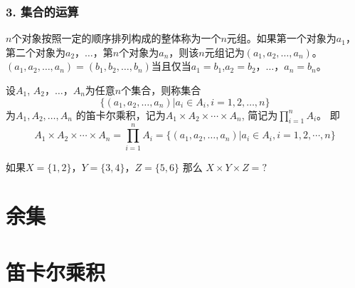 \documentclass{beamer}
\begin{document}
\begin{CJK*}{UTF8}{gbsn}
\begin{frame}
  \frametitle{3. 集合的运算}
  \begin{Def}
    $n$个对象按照一定的顺序排列构成的整体称为一个\alert{$n$元组}。如果第一个对象为$a_1$，第二个对象为$a_2$，$\ldots$，第$n$个对象为$a_n$，则该$n$元组记为$(a_1,a_2, \ldots, a_n)$。
$(a_1,a_2, \ldots, a_n)=(b_1,b_2, \ldots, b_n)$当且仅当$a_1=b_1$,$a_2=b_2$，$\ldots$，$a_n=b_n$。
  \end{Def}\pause
  \begin{Def}
    设$A_1$, $A_2$，$\ldots$，$A_n$为任意$n$个集合，则称集合 \[\{(a_1,a_2, \ldots, a_n)|a_i\in A_i, i = 1,2,\ldots, n\}\] 为$A_1, A_2, \ldots, A_n$ 的\alert{笛卡尔乘积}，记为$A_1 \times A_2 \times \cdots \times A_n$, 简记为$\prod_{i=1}^nA_i$。
即\small{\vspace{-0.4cm}
\begin{equation*}
  A_1 \times A_2 \times \cdots \times A_n = \prod_{i=1}^nA_i = \{(a_1,a_2, \ldots, a_n)|a_i \in A_i, i = 1, 2, \cdots, n\}
\end{equation*}}
  \end{Def}\pause
\vspace{-0.6cm}
  \begin{Ex}
    如果$X=\{1,2\}$，$Y=\{3,4\}$，$Z=\{5,6\}$ 那么 $X \times Y \times Z = ?$
    
  \end{Ex}
\end{frame}

\section{余集}
\section{笛卡尔乘积}

\end{CJK*}
\end{document}
